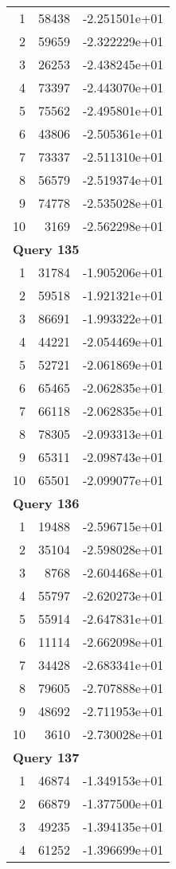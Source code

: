 \begin{longtable}[{p}]{@{}rrp{}@{}}
1 & 58438 & -2.251501e+01 \\
2 & 59659 & -2.322229e+01 \\
3 & 26253 & -2.438245e+01 \\
4 & 73397 & -2.443070e+01 \\
5 & 75562 & -2.495801e+01 \\
6 & 43806 & -2.505361e+01 \\
7 & 73337 & -2.511310e+01 \\
8 & 56579 & -2.519374e+01 \\
9 & 74778 & -2.535028e+01 \\
10 & 3169 & -2.562298e+01 \\
\midrule
\multicolumn{3}{l}{\bfseries Query 135} \\
1 & 31784 & -1.905206e+01 \\
2 & 59518 & -1.921321e+01 \\
3 & 86691 & -1.993322e+01 \\
4 & 44221 & -2.054469e+01 \\
5 & 52721 & -2.061869e+01 \\
6 & 65465 & -2.062835e+01 \\
7 & 66118 & -2.062835e+01 \\
8 & 78305 & -2.093313e+01 \\
9 & 65311 & -2.098743e+01 \\
10 & 65501 & -2.099077e+01 \\
\midrule
\multicolumn{3}{l}{\bfseries Query 136} \\
1 & 19488 & -2.596715e+01 \\
2 & 35104 & -2.598028e+01 \\
3 & 8768 & -2.604468e+01 \\
4 & 55797 & -2.620273e+01 \\
5 & 55914 & -2.647831e+01 \\
6 & 11114 & -2.662098e+01 \\
7 & 34428 & -2.683341e+01 \\
8 & 79605 & -2.707888e+01 \\
9 & 48692 & -2.711953e+01 \\
10 & 3610 & -2.730028e+01 \\
\midrule
\multicolumn{3}{l}{\bfseries Query 137} \\
1 & 46874 & -1.349153e+01 \\
2 & 66879 & -1.377500e+01 \\
3 & 49235 & -1.394135e+01 \\
4 & 61252 & -1.396699e+01 \\

\end{longtable}
